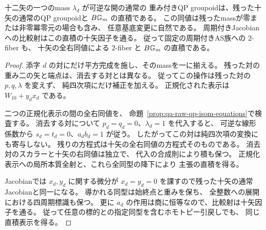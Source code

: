\begin{corollary}[一対を消去する十二矢の全右同値比較]
\label{cor:qa-raw-q12-to-q10-product}
十二矢の一つのmass $\lambda_d$ が可逆な開の通常の
重み付きQP groupoidは、残った十矢の通常のQP groupoidと
$B\mathbb G_m$ の直積である。
この同値は残ったmassが零または非零冪零元の場合も含み、
任意基底変更に自然である。
周期付きJacobianへの比較射はこの直積の十矢因子を通る。
従って固定の周期付きAS族への $2$-fiber も、
十矢の全右同値による $2$-fiber と $B\mathbb G_m$ の直積である。
\end{corollary}
\begin{proof}
添字 $d$ の対にだけ平方完成を施し、そのmassを一に揃える。
残った対の重み二の矢と端点は、消去する対とは異なる。
従ってこの操作は残った対の $p,q,\lambda$ を変えず、
純四次項にだけ補正を加える。
正規化された表示は $W_{10}+y_dx_d$ である。

二つの正規化表示の間の全右同値を、
命題~\ref{prop:qa-raw-qp-isom-equations}で検査する。
消去する対について $p_d=q_d=0$、$\lambda_d=1$ を代入すると、
可逆な線形係数から $s_d=t_d=0$、$a_db_d=1$ が従う。
したがってこの対は純四次項の変換にも寄与しない。
残りの方程式は十矢の全右同値の方程式そのものである。
消去対のスカラーと十矢の右同値は独立で、
代入の合成則により積も保つ。
正規化表示への局所本質全射と、これら全同型の降下により
主張の直積を得る。

Jacobianでは $x_d,y_d$ に関する微分が
$x_d=y_d=0$ を課すので残った十矢の通常Jacobianと同一になる。
導かれる同型は始終点と重みを保ち、
全整数への展開における四周期標識も保つ。
更に $a_d$ の作用は商に恒等なので、比較射は十矢因子を通る。
従って任意の標的との指定同型を含むホモトピー引戻しでも、
同じ直積表示を得る。
\end{proof}


